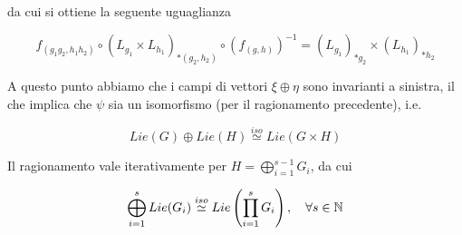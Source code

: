 {da cui si ottiene la seguente uguaglianza

\begin{equation}
	f_{(g_{1} g_{2}, h_{1} h_{2})} \circ (L_{g_{1}} \times L_{h_{1}})_{*(g_{2},h_{2})} \circ (f_{(g,h)})^{-1} = (L_{g_{1}})_{*g_{2}} \times (L_{h_{1}})_{*h_{2}}
\end{equation}

A questo punto abbiamo che i campi di vettori $ \xi \oplus \eta $ sono invarianti a sinistra, il che implica che $ \psi $ sia un isomorfismo (per il ragionamento precedente), i.e.

\begin{equation}
	Lie(G) \oplus Lie(H) \stackrel{iso}{\simeq} Lie(G \times H)
\end{equation}

Il ragionamento vale iterativamente per $ H = \displaystyle\bigoplus_{i=1}^{s-1} G_{i} $, da cui

\begin{equation}
	\bigoplus_{i=1}^{s} Lie(G_{i}) \stackrel{iso}{\simeq} Lie \left( \prod_{i=1}^{s} G_{i} \right) %
	\qcomma \forall s \in \N
\end{equation}
}


